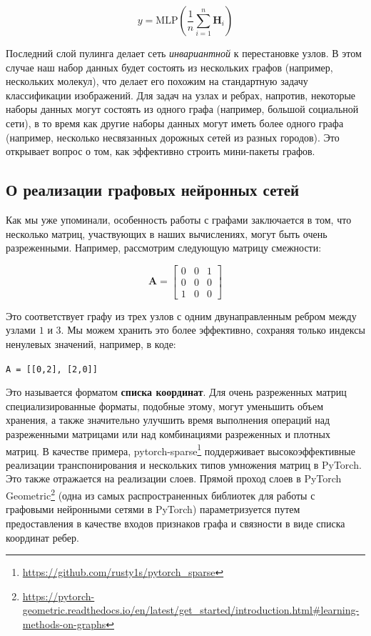 $$
y=\text{MLP}\left(\frac{1}{n}\sum_{i=1}^n \mathbf{H}_i\right)
$$

Последний слой пулинга делает сеть \textit{инвариантной} к перестановке узлов. В этом случае наш набор данных будет состоять из нескольких графов (например, нескольких молекул), что делает его похожим на стандартную задачу классификации изображений. Для задач на узлах и ребрах, напротив, некоторые наборы данных могут состоять из одного графа (например, большой социальной сети), в то время как другие наборы данных могут иметь более одного графа (например, несколько несвязанных дорожных сетей из разных городов). Это открывает вопрос о том, как эффективно строить мини-пакеты графов.

\subsection{О реализации графовых нейронных сетей} \addteacup

Как мы уже упоминали, особенность работы с графами заключается в том, что несколько матриц, участвующих в наших вычислениях, могут быть очень разреженными. Например, рассмотрим следующую матрицу смежности:

$$
\mathbf{A} = \begin{bmatrix} 0 & 0 & 1 \\ 0 & 0 & 0 \\ 1 & 0 & 0 \end{bmatrix}
$$

Это соответствует графу из трех узлов с одним двунаправленным ребром между узлами $1$ и $3$. Мы можем хранить это более эффективно, сохраняя только индексы ненулевых значений, например, в коде:

{\begin{center}\footnotesize
\noindent\texttt{A = [[0,2], [2,0]]}
\end{center}
}

Это называется форматом \textbf{списка координат}. Для очень разреженных матриц специализированные форматы, подобные этому, могут уменьшить объем хранения, а также значительно улучшить время выполнения операций над разреженными матрицами или над комбинациями разреженных и плотных матриц. В качестве примера, pytorch-sparse\footnote{\url{https://github.com/rusty1s/pytorch_sparse}} поддерживает высокоэффективные реализации транспонирования и нескольких типов умножения матриц в PyTorch. Это также отражается на реализации слоев. Прямой проход слоев в PyTorch Geometric\footnote{\url{https://pytorch-geometric.readthedocs.io/en/latest/get_started/introduction.html\#learning-methods-on-graphs}} (одна из самых распространенных библиотек для работы с графовыми нейронными сетями в PyTorch) параметризуется путем предоставления в качестве входов признаков графа и связности в виде списка координат ребер.

